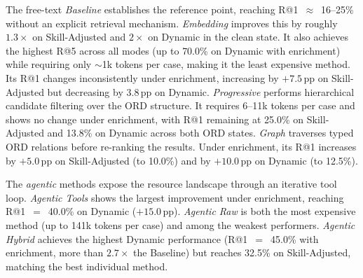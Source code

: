 \documentclass[10pt,twocolumn]{article}
\begin{document}
The free-text \emph{Baseline} establishes the reference point, reaching R@1~$\approx$~16--25\% without an explicit retrieval mechanism. \emph{Embedding} improves this by roughly $1.3\times$ on Skill-Adjusted and $2\times$ on Dynamic in the clean state. It also achieves the highest R@5 across all modes (up to 70.0\% on Dynamic with enrichment) while requiring only $\sim$1k tokens per case, making it the least expensive method. Its R@1 changes inconsistently under enrichment, increasing by $+7.5$\,pp on Skill-Adjusted but decreasing by $3.8$\,pp on Dynamic. \emph{Progressive} performs hierarchical candidate filtering over the ORD structure. It requires 6--11k tokens per case and shows no change under enrichment, with R@1 remaining at 25.0\% on Skill-Adjusted and 13.8\% on Dynamic across both ORD states. \emph{Graph} traverses typed ORD relations before re-ranking the results. Under enrichment, its R@1 increases by $+5.0$\,pp on Skill-Adjusted (to 10.0\%) and by $+10.0$\,pp on Dynamic (to 12.5\%). 

The \emph{agentic} methods expose the resource landscape through an iterative tool loop. \emph{Agentic Tools} shows the largest improvement under enrichment, reaching R@1~$=$~40.0\% on Dynamic ($+15.0$\,pp). \emph{Agentic Raw} is both the most expensive method (up to 141k tokens per case) and among the weakest performers. \emph{Agentic Hybrid} achieves the highest Dynamic performance (R@1~$=$~45.0\% with enrichment, more than $2.7\times$ the Baseline) but reaches 32.5\% on Skill-Adjusted, matching the best individual method.
\end{document}

